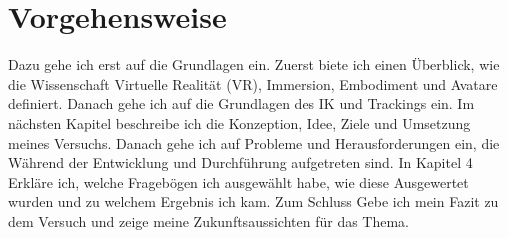 \section{Vorgehensweise}
Dazu gehe ich erst auf die Grundlagen ein. Zuerst biete ich einen Überblick, wie die Wissenschaft Virtuelle Realität (VR), Immersion, Embodiment und Avatare definiert. Danach gehe ich auf die Grundlagen des IK und Trackings ein. Im nächsten Kapitel beschreibe ich die Konzeption, Idee, Ziele und Umsetzung meines Versuchs. Danach gehe ich auf Probleme und Herausforderungen ein, die Während der Entwicklung und Durchführung aufgetreten sind. In Kapitel 4 Erkläre ich, welche Fragebögen ich ausgewählt habe, wie diese Ausgewertet wurden und zu welchem Ergebnis ich kam. Zum Schluss Gebe ich mein Fazit zu dem Versuch und zeige meine Zukunftsaussichten für das Thema.